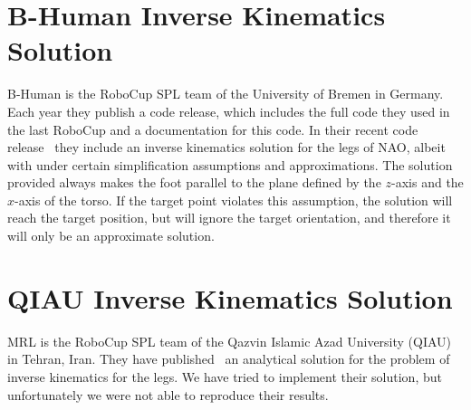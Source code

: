 \section{B-Human Inverse Kinematics Solution}
B-Human is the RoboCup SPL team of the University of Bremen in Germany. Each year they publish a code release, which includes the full code they used in the last RoboCup and a documentation for this code. In their recent code release~\cite{bhuman} they include an inverse kinematics solution for the legs of NAO, albeit with under certain simplification assumptions and approximations. The solution provided always makes the foot parallel to the plane defined by the $z$-axis and the $x$-axis of the torso. If the target point violates this assumption, the solution will reach the target position, but will ignore the target orientation, and therefore it will only be an approximate solution. 

\section{QIAU Inverse Kinematics Solution}
MRL is the RoboCup SPL team of the Qazvin Islamic Azad University (QIAU) in Tehran, Iran. They have published~\cite{iran} an analytical solution for the problem of inverse kinematics for the legs. We have tried to implement their solution, but unfortunately we were not able to reproduce their results.